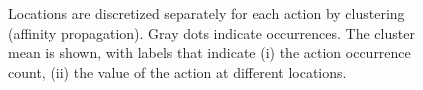 \begin{figure}
		\centering     %
		\caption{Locations are discretized separately for each action by clustering (affinity propagation). Gray dots indicate occurrences. The cluster mean is shown, with labels that indicate (i) the action occurrence count, (ii) the value of the action at different locations.}\label{fig:clustering}
	\end{figure}






